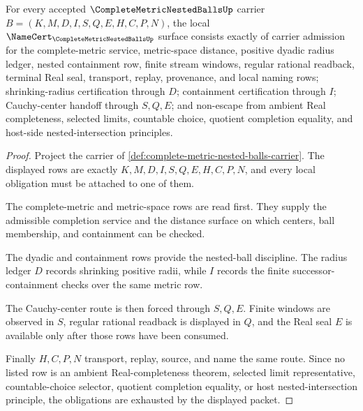 \begin{theorem}
\label{thm:complete-metric-nested-balls-namecert-obligations}
For every accepted $\CompleteMetricNestedBallsUp$ carrier $B=(K,M,D,I,S,Q,E,H,C,P,N)$, the local $\NameCert_{\CompleteMetricNestedBallsUp}$ surface consists exactly of carrier admission for the complete-metric service, metric-space distance, positive dyadic radius ledger, nested containment row, finite stream windows, regular rational readback, terminal Real seal, transport, replay, provenance, and local naming rows; shrinking-radius certification through $D$; containment certification through $I$; Cauchy-center handoff through $S,Q,E$; and non-escape from ambient Real completeness, selected limits, countable choice, quotient completion equality, and host-side nested-intersection principles.
\end{theorem}
\begin{proof}
Project the carrier of \autoref{def:complete-metric-nested-balls-carrier}. The displayed rows are exactly $K,M,D,I,S,Q,E,H,C,P,N$, and every local obligation must be attached to one of them.

The complete-metric and metric-space rows are read first. They supply the admissible completion service and the distance surface on which centers, ball membership, and containment can be checked.

The dyadic and containment rows provide the nested-ball discipline. The radius ledger $D$ records shrinking positive radii, while $I$ records the finite successor-containment checks over the same metric row.

The Cauchy-center route is then forced through $S,Q,E$. Finite windows are observed in $S$, regular rational readback is displayed in $Q$, and the Real seal $E$ is available only after those rows have been consumed.

Finally $H,C,P,N$ transport, replay, source, and name the same route. Since no listed row is an ambient Real-completeness theorem, selected limit representative, countable-choice selector, quotient completion equality, or host nested-intersection principle, the obligations are exhausted by the displayed packet.
\end{proof}

